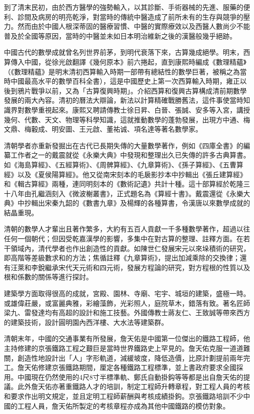 到了清末民初，由於西方醫學的強勢輸入，以其診斷、手術器械的先進、服藥的便利、診間及病房的明亮乾淨，對當時的傳統中醫造成了前所未有的生存與競爭的壓力。然而由於中國人根深蒂固的醫療習慣、中醫的實際療效以及西醫人數尚少不能普及於全國等原因，當時的中醫並未如日本明治維新之後的漢醫般幾乎絕跡。

中國古代的數學成就曾名列世界前茅，到明代衰落下來，古算幾成絕學。明末，西算傳入中國，從徐光啟翻譯《幾何原本》前六捲起，直到康熙時編成《數理精蘊》（《數理精蘊》是明末清初西算輸入時期一部帶有總結性的數學巨著，被稱之為當時中國最高水平的數學百科全書），這是中國歷史上第一次西算輸入時期，雍正以後到鴉片戰爭以前，又為「古算復興時期」。介紹西算和復興古算構成清前期數學發展的兩大內容。清初的曆法大辯論，新法以計算精確戰勝舊法，這件事使當時知識界對數學重視起來。康熙又聘請傳教士徐日昇、白晉、張誠、安多等入宮，講授幾何、代數、天文、物理等科學知識，這就推動數學的蓬勃發展，出現方中通、梅文鼎、梅轂成、明安圖、王元啟、董祐诚、項名達等著名數學家。

清朝學者亦重新發掘出在古代已長期失傳的大量數學著作，例如《四庫全書》的編纂工作者之一的戴震就從《永樂大典》中發現和整理出久已失傳的許多古典算書。如《海島算經》、《五經算術》、《周髀算經》、《九章算術》、《孫子算經》、《五曹算經》以及《夏侯陽算經》。他又從南宋刻本的毛扆影抄本中抄輯出《張丘建算經》和《輯古算經》兩種，連同明刻本的《數術記遺》共計十種。這十部算經於乾隆三十八年由孔繼涵刻入《微波榭叢書》，正式題名為《算經十書》。戴震還從《永樂大典》中抄輯出宋秦九韶的《數書九章》及楊輝的各種算書，令漢唐以來數學成就的結晶重現。

清朝的數學人才輩出且著作繁多，大約有五百人貢獻一千多種數學著作，超過以往任何一個朝代；但因受乾嘉漢學的影響，多集中在對古算的整理、註釋方面。在若干領域內，清代學者也作出創造性的貢獻。如陳世仁發展宋元以來垛積術的研究，即高階等差級數求和的方法；焦循註釋《九章算術》，提出加減乘除的交換律；還有汪萊和李銳繼承宋代天元術和四元術，發展方程論的研究，對方程根的性質以及根和係數的關係等進行探討。

建築學方面取得很高的成就，宮殿、園林、寺廟、宅宇、城垣的建築，盛極一時。或雄偉莊嚴，或富麗典雅，彩繪藻飾，光彩照人，庭院草木，錯落有致。著名匠師梁九、雷發達均有高超的設計和施工技藝。外國傳教士蔣友仁、王致誠等帶來西方的建築技術，設計圓明園內西洋樓、大水法等建築群。

清朝末年，中國的交通事業有所發展，詹天佑是中國第一位傑出的鐵路工程師，他主持修建的京張鐵路工程之艱巨是當時世界鐵路史上罕見的。詹天佑克服一道道難關，創造性地設計出「人」字形軌道，減緩坡度，降低造價，比原計劃提前兩年完工。詹天佑修建京張鐵路期間，厘定各種鐵路工程標準，並上書政府要求全國採用。中國現在仍然使用的4尺8寸半標準軌、鄭氏自動掛鈎等等都是出自詹天佑的提議。此外詹天佑亦著重鐵路人才的培訓，制定工程師升轉章程，對工程人員的考核和要求作出明文規定，並且定明工程師薪酬與考核成績掛鉤。京張鐵路培訓不少中國的工程人員，詹天佑所製定的考核章程亦成為其他中國鐵路的模仿對象。
















